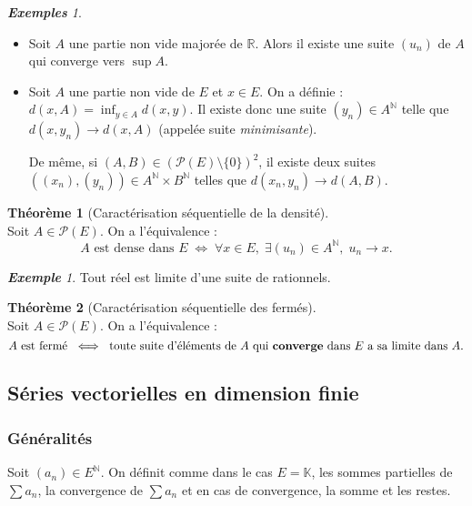 \documentclass[12pt]{book}
\let\ensembleNombre\mathbb
\newcommand*\N{\ensuremath{\ensembleNombre{N}}}
\newcommand*\R{\ensuremath{\ensembleNombre{R}}}
\newcommand*\K{\ensuremath{\ensembleNombre{K}}}
\theoremstyle{definition}
\newtheorem{thme}{Théorème}[chapter]
\theoremstyle{remark}
\newtheorem*{ex}{\textbf{Exemple}}
\newtheorem*{exs}{\textbf{Exemples}}
\newenvironment{fthme}
  {\begin{mdframed}[roundcorner=10pt, linewidth=2pt]\begin{thme}}
  {\end{thme}\end{mdframed}}
\begin{document}
	\begin{exs}\mbox{~}\\
	\begin{itemize}
	\item Soit $A$ une partie non vide majorée de $\R$. Alors il existe une suite $(u_n)$ de $A$ qui converge vers $\sup A$.
	\item Soit $A$ une partie non vide de $E$ et $x \in E$. On a définie : $d(x,A) = \inf_{y\in A} d(x,y)$. Il existe donc une suite $(y_n) \in A^\N$ telle que $d(x,y_n) \longrightarrow d(x,A)$ (appelée suite \textit{minimisante}).
	
	De même, si $(A,B) \in \left(\mathcal P(E) \setminus \lbrace 0 \rbrace\right)^2$, il existe deux suites $((x_n), (y_n)) \in A^\N \times B^\N$ telles que $d(x_n, y_n) \longrightarrow d(A,B)$.
	\end{itemize}
	\end{exs}
	
	\begin{fthme}[Caractérisation séquentielle de la densité]\mbox{~}\\
	Soit $A \in \mathcal P(E)$. On a l'équivalence :
	\[A \text{ est dense dans } E \;\Longleftrightarrow\; \forall x \in E,\; \exists (u_n) \in A^\N,\; u_n \longrightarrow x.\]
	\end{fthme}
	
	\begin{ex}
	Tout réel est limite d'une suite de rationnels.
	\end{ex}
	
	\begin{fthme}[Caractérisation séquentielle des fermés]\mbox{~}\\
	Soit $A \in \mathcal P(E)$. On a l'équivalence :
	\[ A \text{ est fermé } \;\Longleftrightarrow\; \text{ toute suite d'éléments de } A \text{ qui \textbf{converge} dans } E \text{ a sa limite dans } A. \]
	\end{fthme}
	
	\subsection{Séries vectorielles en dimension finie}
		\subsubsection{Généralités}
	Soit $(a_n) \in E^\N$. On définit comme dans le cas $E = \K$, les sommes partielles de $\sum a_n$, la convergence de $\sum a_n$ et en cas de convergence, la somme et les restes.
	
\end{document}
